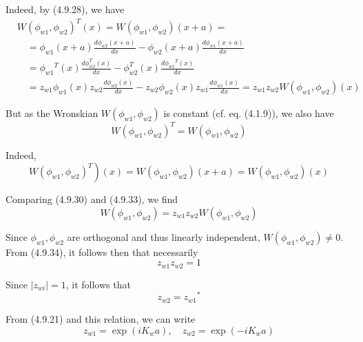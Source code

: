 \documentclass{article}
\begin{document}
Indeed, by (4.9.28), we have
$$
\begin{align*}
& W\left(\phi_{w 1}, \phi_{w 2}\right)^{T}(x)=W\left(\phi_{w 1}, \phi_{w 2}\right)(x+a)=  \tag{4.9.31}\\
& \quad=\phi_{w 1}(x+a) \frac{d \phi_{w 2}(x+a)}{d x}-\phi_{w 2}(x+a) \frac{d \phi_{w 1}(x+a)}{d x} \\
& \quad=\phi_{w 1}{ }^{T}(x) \frac{d \phi_{w 2}^{T}(x)}{d x}-\phi_{w 2}^{T}(x) \frac{d \phi_{w 1}{ }^{T}(x)}{d x} \\
& \quad=z_{w 1} \phi_{w 1}(x) z_{w 2} \frac{d \phi_{w 2}(x)}{d x}-z_{w 2} \phi_{w 2}(x) z_{w 1} \frac{d \phi_{w 1}(x)}{d x}=z_{w 1} z_{w 2} W\left(\phi_{w 1}, \phi_{w 2}\right)(x)
\end{align*}
$$

But as the Wronskian $W\left(\phi_{w 1}, \phi_{w 2}\right)$ is constant (cf. eq. (4.1.9)), we also have
$$
\begin{equation*}
W\left(\phi_{w 1}, \phi_{w 2}\right)^{T}=W\left(\phi_{w 1}, \phi_{w 2}\right) \tag{4.9.32}
\end{equation*}
$$

Indeed,
$$
\begin{equation*}
\left.W\left(\phi_{w 1}, \phi_{w 2}\right)^{T}\right)(x)=W\left(\phi_{w 1}, \phi_{w 2}\right)(x+a)=W\left(\phi_{w 1}, \phi_{w 2}\right)(x) \tag{4.9.33}
\end{equation*}
$$

Comparing (4.9.30) and (4.9.33), we find
$$
\begin{equation*}
W\left(\phi_{w 1}, \phi_{w 2}\right)=z_{w 1} z_{w 2} W\left(\phi_{w 1}, \phi_{w 2}\right) \tag{4.9.34}
\end{equation*}
$$

Since $\phi_{w 1}, \phi_{w 2}$ are orthogonal and thus linearly independent, $W\left(\phi_{w 1}, \phi_{w 2}\right) \neq 0$. From (4.9.34), it follows then that necessarily
$$
\begin{equation*}
z_{w 1} z_{w 2}=1 \tag{4.9.35}
\end{equation*}
$$

Since $\left|z_{w i}\right|=1$, it follows that
$$
\begin{equation*}
z_{w 2}=z_{w 1}{ }^{*} \tag{4.9.36}
\end{equation*}
$$

From (4.9.21) and this relation, we can write
$$
\begin{equation*}
z_{w 1}=\exp \left(i K_{w} a\right), \quad z_{w 2}=\exp \left(-i K_{w} a\right) \tag{4.9.37}
\end{equation*}
$$
\end{document}
